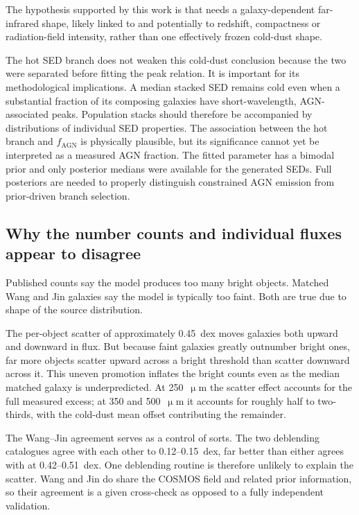 \documentclass[12pt,a4paper]{article}
\begin{document}
The hypothesis supported by this work is that \popcosmos{} needs a galaxy-dependent
far-infrared shape, likely linked to \LIR{} and potentially to redshift, compactness
or radiation-field intensity, rather than one effectively frozen cold-dust shape.

The hot SED branch does not weaken this cold-dust conclusion because the two were
separated before fitting the peak relation. It is important for its methodological implications.
A median stacked SED remains cold even when a substantial fraction of its composing
galaxies have short-wavelength, AGN-associated peaks. Population stacks should therefore
be accompanied by distributions of individual SED properties. The association
between the hot branch and $f_\mathrm{AGN}$ is physically plausible, but its significance
cannot yet be interpreted as a measured AGN fraction. The fitted parameter has a
bimodal prior and only posterior medians were available for the generated SEDs. Full
posteriors are needed to properly distinguish constrained AGN emission from
prior-driven branch selection.

\subsection{Why the number counts and individual fluxes appear to disagree}
\label{sec:discussion:paradox}

Published counts say the model produces too many bright objects. Matched Wang and Jin
galaxies say the model is typically too faint. Both are true due to shape of the source distribution.

The per-object scatter of approximately \SI{0.45}{dex} moves galaxies both upward and
downward in flux. But because faint galaxies greatly outnumber bright ones, far more
objects scatter upward across a bright threshold than scatter downward across it. This
uneven promotion inflates the bright counts even as the median matched galaxy is
underpredicted. At 250~$\upmu$m the scatter effect accounts for the full measured
excess; at 350 and 500~$\upmu$m it accounts for roughly half to two-thirds, with the
cold-dust mean offset contributing the remainder.

The Wang--Jin agreement serves as a control of sorts. The two deblending catalogues agree with
each other to 0.12--\SI{0.15}{dex}, far better than either agrees with \popcosmos{}
at 0.42--\SI{0.51}{dex}. One deblending routine is therefore unlikely to explain the
scatter. Wang and Jin do share the COSMOS field and related prior information, so their
agreement is a given cross-check as opposed to a fully independent validation. 
\end{document}
